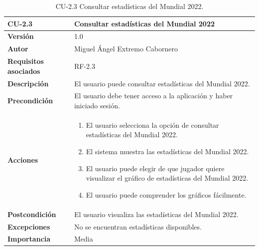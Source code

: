 \begin{table}[p]
    \centering
    \begin{tabularx}{\linewidth}{ p{} p{} }
        \toprule
        \textbf{CU-2.3}    & \textbf{Consultar estadísticas del Mundial 2022}\\
        \toprule
        \textbf{Versión}              & 1.0    \\
        \textbf{Autor}                & Miguel Ángel Extremo Cabornero \\
        \textbf{Requisitos asociados} & RF-2.3 \\
        \textbf{Descripción}          & El usuario puede consultar estadísticas del Mundial 2022. \\
        \textbf{Precondición}         & El usuario debe tener acceso a la aplicación y haber iniciado sesión. \\
        \textbf{Acciones}             &
        \begin{enumerate}
            \item El usuario selecciona la opción de consultar estadísticas del Mundial 2022.
            \item El sistema muestra las estadísticas del Mundial 2022.
            \item El usuario puede elegir de que jugador quiere visualizar el gráfico de estadísticas del Mundial 2022.
            \item El usuario puede comprender los gráficos fácilmente.
        \end{enumerate}\\
        \textbf{Postcondición}        & El usuario visualiza las estadísticas del Mundial 2022. \\
        \textbf{Excepciones}          & No se encuentran estadísticas disponibles. \\
        \textbf{Importancia}          & Media \\
        \bottomrule
    \end{tabularx}
    \caption{CU-2.3 Consultar estadísticas del Mundial 2022.}
\end{table}


